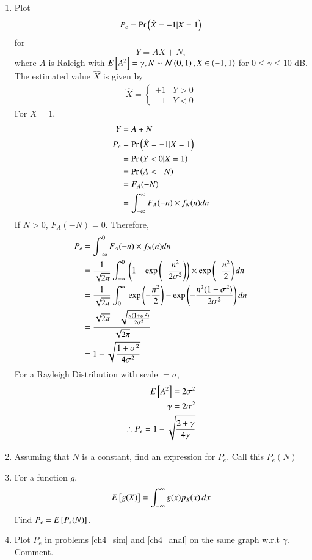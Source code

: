 \begin{enumerate}[label=\thesection.\arabic*.,ref=\thesection.\theenumi]
\item
\label{ch4_sim}
Plot 
\begin{equation}
P_e = \Pr\left(\hat{X} = -1|X=1\right)
\end{equation}
%
for 
\begin{equation}
Y = AX+N,
\end{equation}
where $A$ is Raleigh with $E{}\left[A^2\right] = \gamma, N \sim \mathcal{N}\left(0,1\right), X \in \left(-1,1\right)$ for $0 \le \gamma \le 10$ dB.
\\
\solution The estimated value $\hat{X}$ is given by
\begin{align}
\hat{X} = 
\begin{cases}
+1 & Y>0\\
-1 & Y<0
\end{cases}
\end{align}
For $X = 1$, 
\begin{align}
Y &= A + N\\
P_e &= \Pr\left(\hat{X} = -1|X=1\right) \\
&= \Pr\left(Y<0 |X=1\right)\\
&= \Pr\left(A<-N\right)\\
&= F_A(-N)\\
&= \int_{-\infty}^{\infty} F_A(-n) \times f_N(n) dn
\end{align}
If $N>0$, $F_A(-N) = 0$. Therefore,
\begin{align}
P_e &= \int_{-\infty}^{0} F_A(-n) \times f_N(n) dn\\
&= \frac{1}{\sqrt{2\pi}}\int_{-\infty}^{0} \left(1-\exp \left( -\frac{n^2}{2\sigma^2} \right) \right) \times \exp \left( -\frac{n^2}{2} \right) dn\\
&= \frac{1}{\sqrt{2\pi}} \int_{0}^{\infty} \exp \left( -\frac{n^2}{2} \right) - \exp \left( -\frac{n^2(1+\sigma^2)}{2\sigma^2} \right) dn\\
&= \frac{\sqrt{2\pi} - \sqrt{\frac{\pi(1+\sigma^2)}{2\sigma^2}}}{\sqrt{2\pi}}\\
&= 1 - \sqrt{\frac{1+\sigma^2}{4\sigma^2}}
\end{align}
For a Rayleigh Distribution with scale $= \sigma$,
\begin{align}
E{}\left[A^2\right] = 2\sigma^2\\
\gamma = 2\sigma^2\\
\therefore P_e = 1 - \sqrt{\frac{2+\gamma}{4\gamma}}
\end{align}
%
\item
Assuming that $N$ is a constant, find an expression for $P_e$.  Call this $P_e(N)$

%
\item
%
\label{ch4_anal}
For a function $g$,
\begin{equation}
E{}\left[g(X)\right] = \int_{-\infty}^{\infty}g(x)p_{X}(x)\, dx
\end{equation}
%
Find $P_e = E{}\left[P_e(N)\right]$.

%
\item
Plot $P_e$ in problems \ref{ch4_sim} and \ref{ch4_anal} on the same graph w.r.t $\gamma$.  Comment.

\end{enumerate}

